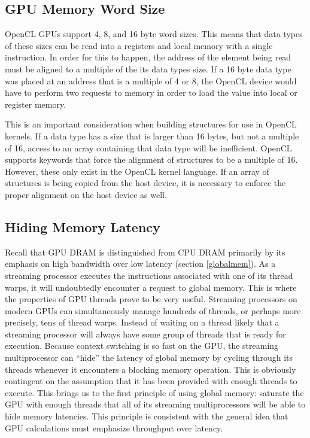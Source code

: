 \documentclass[12pt,twoside]{reedthesis}
\begin{document}
\subsection{GPU Memory Word Size}

OpenCL GPUs support 4, 8, and 16 byte word sizes. This means that data types of these sizes can be read into a registers and local memory with a single instruction. In order for this to happen, the address of the element being read must be aligned to a multiple of the its data types size. If a 16 byte data type was placed at an address that is a multiple of 4 or 8, the OpenCL device would have to perform two requests to memory in order to load the value into local or register memory.

This is an important consideration when building structures for use in OpenCL kernels. If a data type has a size that is larger than 16 bytes, but not a multiple of 16, access to an array containing that data type will be inefficient. OpenCL supports keywords that force the alignment of structures to be a multiple of 16. However, these only exist in the OpenCL kernel language. If an array of structures is being copied from the host device, it is necessary to enforce the proper alignment on the host device as well.

\subsection{Hiding Memory Latency}

Recall that GPU DRAM is distinguished from CPU DRAM primarily by its emphasis on high bandwidth over low latency (section \ref{globalmem}). As a streaming processor executes the instructions associated with one of its thread warps, it will undoubtedly encounter a request to global memory.  This is where the properties of GPU threads prove to be very useful. Streaming processors on modern GPUs can simultaneously manage hundreds of threads, or perhaps more precisely, tens of thread warps. Instead of waiting on a thread likely that a streaming processor will always have some group of threads that is ready for execution. Because context switching is so fast on the GPU, the streaming multiprocessor can ``hide'' the latency of global memory by cycling through its threads whenever it encounters a blocking memory operation. This is obviously contingent on the assumption that it has been provided with enough threads to execute. This brings us to the first principle of using global memory: saturate the GPU with enough threads that all of its streaming multiprocessors will be able to hide memory latencies. This principle is consistent with the general idea that GPU calculations must emphasize throughput over latency.
\end{document}
